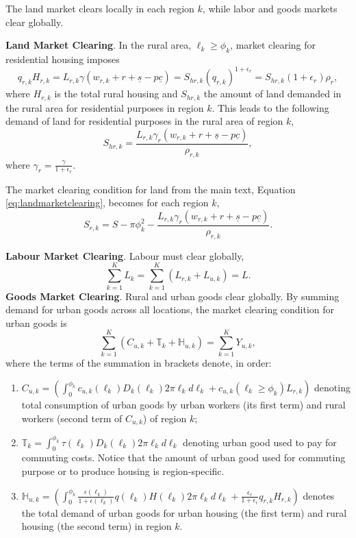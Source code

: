\documentclass[11pt]{report}
\begin{document}
The land market clears locally in each region $k$, while labor and goods markets clear globally.

\noindent \textbf{Land Market Clearing}. In the rural area, $\ell_k \geq \phi_k$, market clearing for residential housing imposes
\begin{equation*}
q_{r,k}H_{r,k}=L_{r,k} \gamma \left( w_{r,k}+r+\underline{s}-p\underline{c}\right)=S_{hr,k} \left(q_{r,k}\right)^{1+\epsilon_r}=S_{hr,k}(1+\epsilon_r)\rho_r,
\end{equation*}
where $H_{r,k}$ is the total rural housing and $S_{hr,k}$ the amount of land demanded in the rural area for residential purposes in region $k$. This leads to the following demand of land for residential purposes in the rural area of region $k$,
\begin{equation*}
S_{hr,k}=\frac{L_{r,k} \gamma_r \left( w_{r,k}+r+ \underline{s}-p\underline{c}\right)}{ \rho_{r,k}}, \label{B-eq:QShr2}
\end{equation*}
where $\gamma_r=\frac{\gamma}{1+\epsilon_r}$. 

The market clearing condition for land from the main text, Equation \eqref{eq:landmarketclearing}, becomes for each region $k$,
\begin{equation}
S_{r,k} =S-\pi\phi_k^2-\frac{L_{r,k} \gamma_r \left( w_{r,k}+r+ \underline{s}-p\underline{c}\right)}{ \rho_{r,k}}. \label{B-eq:Qlandmarketclearing2}
\end{equation}

\noindent \textbf{Labour Market Clearing}. Labour must clear globally,
\begin{equation}
\sum_{k=1}^{K}L_k=\sum_{k=1}^{K}(L_{r,k}+L_{u,k})=L. \label{B-eq:clearing-labork}
\end{equation}
\noindent \textbf{Goods Market Clearing}. Rural and urban goods clear globally. By summing demand for urban goods across all locations, the market clearing condition for urban goods is
\begin{equation}
\sum_{k=1}^K \left( C_{u,k} + \mathbb{T}_k + \mathbb{H}_{u,k} \right)= \sum_{k=1}^K  Y_{u,k} \label{B-eq:goods-market-clearing-k},
\end{equation}
where the terms of the summation in brackets denote, in order: 
\begin{enumerate}
	\item$C_{u,k}=\left( \int_0^{\phi_k} c_{u,k}(\ell_k)D_k(\ell_k) 2\pi \ell_k d\ell_k+ c_{u,k}(\ell_k \geq \phi_k)L_{r,k}\right) $ denoting total consumption of urban goods by urban workers (its first term) and rural workers (second term of $C_{u,k}$) of region $k$;
	\item $\mathbb{T}_k = \int_0^{\phi_k} \tau(\ell_k)D_k(\ell_k)2\pi \ell_k d\ell_k$ denoting urban good used to pay for commuting costs. Notice that the amount of urban good used for commuting purpose or to produce housing is region-specific.
	\item $\mathbb{H}_{u,k}=\left(\int_0^{\phi_k} \frac{\epsilon(\ell_k)}{1+ \epsilon(\ell_k)}q(\ell_k)H(\ell_k)2\pi \ell_k d\ell_k +\frac{\epsilon_r}{1+ \epsilon_r}q_{r,k}H_{r,k}\right)$ denotes the total demand of urban goods for urban housing (the first term) and rural housing (the second term) in region $k$.
\end{enumerate}
\end{document}
